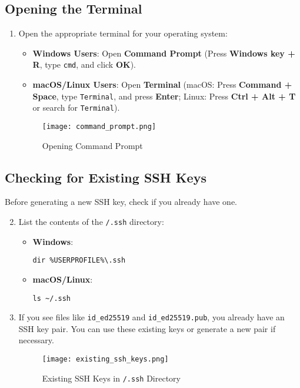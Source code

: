 \documentclass[12pt,letterpaper]{article}
\newcommand{\mytexttilde}{\raisebox{0.5ex}{\texttildelow}}
\begin{document}
\subsection{Opening the Terminal}

\begin{enumerate}
    \item Open the appropriate terminal for your operating system:
    \begin{itemize}
        \item \textbf{Windows Users}: Open \textbf{Command Prompt} (Press \textbf{Windows key + R}, type \texttt{cmd}, and click \textbf{OK}).
        \item \textbf{macOS/Linux Users}: Open \textbf{Terminal} (macOS: Press \textbf{Command + Space}, type \texttt{Terminal}, and press \textbf{Enter}; Linux: Press \textbf{Ctrl + Alt + T} or search for \texttt{Terminal}).
    \end{itemize}

    \begin{figure}[H]
        \centering
        \texttt{[image: command\_prompt.png]}
        \caption{Opening Command Prompt}
        \label{fig:command_prompt}
    \end{figure}
\end{enumerate}

\subsection{Checking for Existing SSH Keys}

Before generating a new SSH key, check if you already have one.

\begin{enumerate}
    \setcounter{enumi}{1}
    \item List the contents of the \texttt{\mytexttilde/.ssh} directory:
    \begin{itemize}
        \item \textbf{Windows}:
        \begin{lstlisting}[style=custombash]
dir %USERPROFILE%\.ssh
        \end{lstlisting}
        \item \textbf{macOS/Linux}:
        \begin{lstlisting}[style=custombash]
ls ~/.ssh
        \end{lstlisting}
    \end{itemize}
    \item If you see files like \texttt{id\_ed25519} and \texttt{id\_ed25519.pub}, you already have an SSH key pair. You can use these existing keys or generate a new pair if necessary.

    \begin{figure}[H]
        \centering
        \texttt{[image: existing\_ssh\_keys.png]}
        \caption{Existing SSH Keys in \texttt{\mytexttilde/.ssh} Directory}
        \label{fig:existing_ssh_keys}
    \end{figure}
\end{enumerate}
\end{document}
